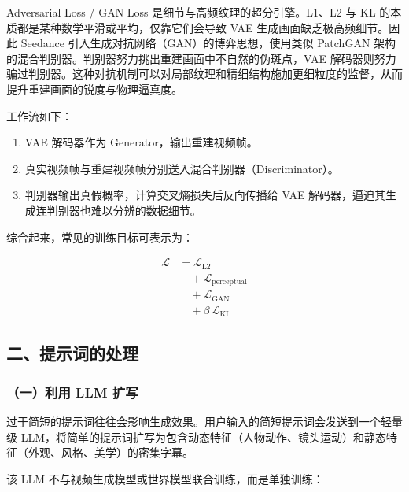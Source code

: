 Adversarial Loss / GAN Loss 是细节与高频纹理的超分引擎。L1、L2 与 KL 的本质都是某种数学平滑或平均，仅靠它们会导致 VAE 生成画面缺乏极高频细节。因此 Seedance 引入生成对抗网络（GAN）的博弈思想，使用类似 PatchGAN 架构的混合判别器。判别器努力挑出重建画面中不自然的伪斑点，VAE 解码器则努力骗过判别器。这种对抗机制可以对局部纹理和精细结构施加更细粒度的监督，从而提升重建画面的锐度与物理逼真度。

工作流如下：

\begin{enumerate}
\def\labelenumi{\arabic{enumi}.}
\tightlist
\item
  VAE 解码器作为 Generator，输出重建视频帧。
\item
  真实视频帧与重建视频帧分别送入混合判别器（Discriminator）。
\item
  判别器输出真假概率，计算交叉熵损失后反向传播给 VAE 解码器，逼迫其生成连判别器也难以分辨的数据细节。
\end{enumerate}

综合起来，常见的训练目标可表示为：

\[
\begin{aligned}
\mathcal{L}
&= \mathcal{L}_{\mathrm{L2}}
\\
&\quad + \mathcal{L}_{\mathrm{perceptual}}
\\
&\quad + \mathcal{L}_{\mathrm{GAN}}
\\
&\quad + \beta\,\mathcal{L}_{\mathrm{KL}}
\end{aligned}
\]

\hypertarget{ux4e8cux63d0ux793aux8bcdux7684ux5904ux7406}{%
\subsection{二、提示词的处理}\label{ux4e8cux63d0ux793aux8bcdux7684ux5904ux7406}}

\hypertarget{ux4e00ux5229ux7528-llm-ux6269ux5199}{%
\subsubsection{（一）利用 LLM 扩写}\label{ux4e00ux5229ux7528-llm-ux6269ux5199}}

过于简短的提示词往往会影响生成效果。用户输入的简短提示词会发送到一个轻量级 LLM，将简单的提示词扩写为包含动态特征（人物动作、镜头运动）和静态特征（外观、风格、美学）的密集字幕。

该 LLM 不与视频生成模型或世界模型联合训练，而是单独训练：

